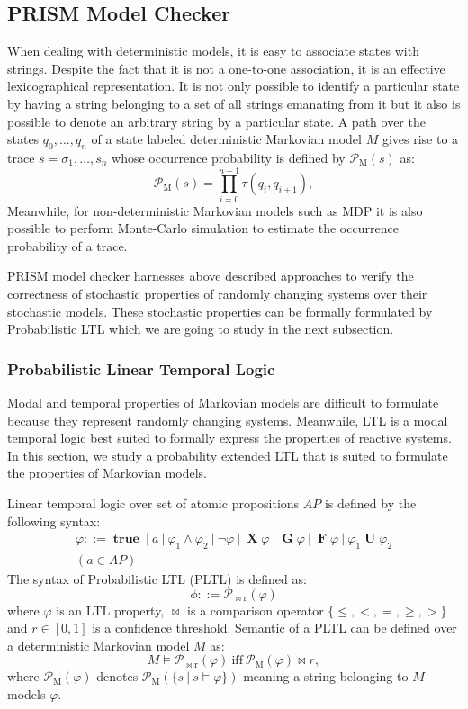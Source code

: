 \documentclass[
a4paper,
12pt
]{scrartcl}
\newcommand\true {\operatorname {\mathbf{true}}}
\newcommand\X{ \operatorname {\mathbf{X}}}
\newcommand\G{ \operatorname {\mathbf{G}}}
\newcommand\F{ \operatorname {\mathbf{F}}}
\newcommand\U{ \operatorname {\mathbf{U}}}
\newcommand\Prob[1]{ \operatorname {\mathcal{P}_{#1}}}
\begin{document}
\subsection{PRISM Model Checker}
When dealing with deterministic models, it is easy to associate states with strings. Despite the fact that it is not a one-to-one association, it is an effective lexicographical representation. It is not only possible to identify a particular state by having a string belonging to a set of all strings emanating from it but it also is possible to denote an arbitrary string by a particular state.
A path over the states $q_0, \dots, q_n$ of a state labeled deterministic Markovian model $M$ gives rise to a trace $s = \sigma_1, \dots, s_n$ whose occurrence probability is defined by $\Prob{M}(s)$ as:
\begin{equation*}
  \Prob{M}(s) = \prod_{i=0}^{n-1}\tau(q_i,q_{i+1}),
\end{equation*}
Meanwhile, for non-deterministic Markovian models such as MDP it is also possible to perform Monte-Carlo simulation to estimate the occurrence probability of a trace.
\par PRISM model checker harnesses above described approaches to verify the correctness of stochastic properties of randomly changing systems over their stochastic models. These stochastic properties can be formally formulated by Probabilistic LTL which we are going to study in the next subsection.
\subsubsection{Probabilistic Linear Temporal Logic}
Modal and temporal properties of Markovian models are difficult to formulate because they represent randomly changing systems. Meanwhile, LTL is a modal temporal logic best suited to formally express the properties of reactive systems. In this section, we study a probability extended LTL that is suited to formulate the properties of Markovian models.
\par Linear temporal logic over set of atomic propositions $AP$ is defined by the following syntax:
\begin{multline*}
  \varphi ::= \true~|~a~|~\varphi_1 \land \varphi_2~|~\neg \varphi~|~\X \varphi~|~\G \varphi~|~\F \varphi~|~\varphi_1 \U \varphi_2 \\
  (a \in AP)
\end{multline*}
The syntax of Probabilistic LTL (PLTL) is defined as:
\begin{equation*}
  \phi ::= \Prob{\bowtie r} (\varphi)
\end{equation*}
where $\varphi$ is an LTL property, $\bowtie$ is a comparison operator $\{\leq, <, =, \geq, >\}$ and $r \in [0,1]$ is a confidence threshold.
Semantic of a PLTL can be defined over a deterministic Markovian model $M$ as:
\begin{equation*}
  M \models \Prob{\bowtie r}(\varphi)~\text{iff}~ \Prob{M}(\varphi) \bowtie r,
\end{equation*}
where $\Prob{M}(\varphi)$ denotes $\Prob{M}(\{s~|~s \models \varphi \})$ meaning a string belonging to $M$ models $\varphi$.
\end{document}
